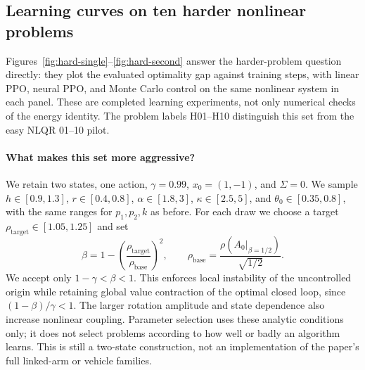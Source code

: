 \documentclass[11pt]{article}
\begin{document}
\subsection{Learning curves on ten harder nonlinear problems}
\label{sec:hard-learning}

Figures~\ref{fig:hard-single}--\ref{fig:hard-second} answer the harder-problem
question directly: they plot the evaluated optimality gap against training steps,
with linear PPO, neural PPO, and Monte Carlo control on the same nonlinear
system in each panel. These are completed learning experiments, not only numerical
checks of the energy identity. The problem labels H01--H10 distinguish this set
from the easy NLQR 01--10 pilot.

\paragraph{What makes this set more aggressive?}
We retain two states, one action, $\gamma=0.99$, $x_0=(1,-1)$, and $\Sigma=0$.
We sample $h\in[0.9,1.3]$, $r\in[0.4,0.8]$, $\alpha\in[1.8,3]$,
$\kappa\in[2.5,5]$, and $\theta_0\in[0.35,0.8]$, with the same ranges for
$p_1,p_2,k$ as before. For each draw we choose a target
$\rho_{\mathrm{target}}\in[1.05,1.25]$ and set
\[
 \beta=1-\left(\frac{\rho_{\mathrm{target}}}{\rho_{\mathrm{base}}}\right)^2,
 \qquad
 \rho_{\mathrm{base}}=\frac{\rho(A_0\vert_{\beta=1/2})}{\sqrt{1/2}}.
\]
We accept only $1-\gamma<\beta<1$. This enforces local instability of the
uncontrolled origin while retaining global value contraction of the optimal
closed loop, since $(1-\beta)/\gamma<1$. The larger rotation amplitude and
state dependence also increase nonlinear coupling. Parameter selection uses
these analytic conditions only; it does not select problems according to how
well or badly an algorithm learns. This is still a two-state construction,
not an implementation of the paper's full linked-arm or vehicle families.
\end{document}
